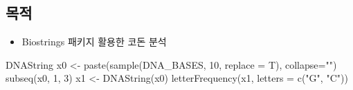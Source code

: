 \documentclass[
]{book}
\newenvironment{Shaded}{\begin{snugshade}}{\end{snugshade}}
\newcommand{\AttributeTok}[1]{\textcolor[rgb]{0.77,0.63,0.00}{#1}}
\newcommand{\DecValTok}[1]{\textcolor[rgb]{0.00,0.00,0.81}{#1}}
\newcommand{\FunctionTok}[1]{\textcolor[rgb]{0.00,0.00,0.00}{#1}}
\newcommand{\NormalTok}[1]{#1}
\newcommand{\OtherTok}[1]{\textcolor[rgb]{0.56,0.35,0.01}{#1}}
\newcommand{\StringTok}[1]{\textcolor[rgb]{0.31,0.60,0.02}{#1}}
\providecommand{\tightlist}{%
  \setlength{\itemsep}{0pt}\setlength{\parskip}{0pt}}
\begin{document}
\hypertarget{day2_class4_objectives}{%
\subsection{목적}\label{day2_class4_objectives}}

\begin{itemize}
\tightlist
\item
  Biostrings 패키지 활용한 코돈 분석
\end{itemize}

\begin{Shaded}
\begin{Highlighting}[]
\NormalTok{DNAString}
\NormalTok{x0 }\OtherTok{\textless{}{-}} \FunctionTok{paste}\NormalTok{(}\FunctionTok{sample}\NormalTok{(DNA\_BASES, }\DecValTok{10}\NormalTok{, }\AttributeTok{replace =}\NormalTok{ T), }\AttributeTok{collapse=}\StringTok{""}\NormalTok{)}
\FunctionTok{subseq}\NormalTok{(x0, }\DecValTok{1}\NormalTok{, }\DecValTok{3}\NormalTok{)}
\NormalTok{x1 }\OtherTok{\textless{}{-}} \FunctionTok{DNAString}\NormalTok{(x0)}
\FunctionTok{letterFrequency}\NormalTok{(x1, }\AttributeTok{letters =} \FunctionTok{c}\NormalTok{(}\StringTok{"G"}\NormalTok{, }\StringTok{"C"}\NormalTok{))}
\end{Highlighting}
\end{Shaded}
\end{document}
